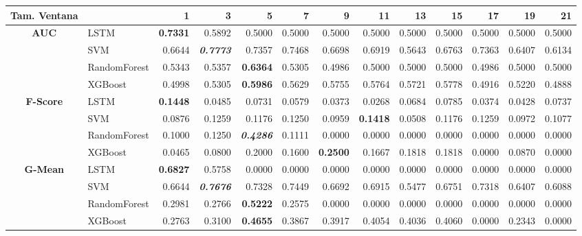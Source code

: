 \begin{table}[H]
	\centering
	\begin{adjustbox}{max width=14cm}
		\begin{tabular}{|c|l|r|r|r|r|r|r|r|r|r|r|r|}
			\hline
			\textbf{Tam. Ventana} &         &      1  &      3  &      5  &      7  &      9  &      11 &      13 &      15 &      17 &      19 &      21 \\
			\hline
			\textbf{AUC} &  LSTM & \textbf{  0.7331 } &  0.5892 &  0.5000 &  0.5000 &  0.5000 &  0.5000 &  0.5000 &  0.5000 &  0.5000 &  0.5000 &  0.5000 \\
			&  SVM &  0.6644 & \textit{ \textbf{  0.7773 } } &  0.7357 &  0.7468 &  0.6698 &  0.6919 &  0.5643 &  0.6763 &  0.7363 &  0.6407 &  0.6134 \\
			&  RandomForest &  0.5343 &  0.5357 & \textbf{  0.6364 } &  0.5305 &  0.4986 &  0.5000 &  0.5000 &  0.5000 &  0.4986 &  0.5000 &  0.5000 \\
			&  XGBoost &  0.4998 &  0.5305 & \textbf{  0.5986 } &  0.5629 &  0.5755 &  0.5764 &  0.5721 &  0.5778 &  0.4916 &  0.5220 &  0.4888 \\
			\hline
			\textbf{F-Score} &  LSTM & \textbf{  0.1448 } &  0.0485 &  0.0731 &  0.0579 &  0.0373 &  0.0268 &  0.0684 &  0.0785 &  0.0374 &  0.0428 &  0.0737 \\
			&  SVM &  0.0876 &  0.1259 &  0.1176 &  0.1250 &  0.0959 & \textbf{  0.1418 } &  0.0508 &  0.1176 &  0.1259 &  0.0972 &  0.1077 \\
			&  RandomForest &  0.1000 &  0.1250 & \textit{ \textbf{  0.4286 } } &  0.1111 &  0.0000 &  0.0000 &  0.0000 &  0.0000 &  0.0000 &  0.0000 &  0.0000 \\
			&  XGBoost &  0.0465 &  0.0800 &  0.2000 &  0.1600 & \textbf{  0.2500 } &  0.1667 &  0.1818 &  0.1818 &  0.0000 &  0.0870 &  0.0000 \\
			\hline
			\textbf{G-Mean} &  LSTM & \textbf{  0.6827 } &  0.5758 &  0.0000 &  0.0000 &  0.0000 &  0.0000 &  0.0000 &  0.0000 &  0.0000 &  0.0000 &  0.0000 \\
			&  SVM &  0.6644 & \textit{ \textbf{  0.7676 } } &  0.7328 &  0.7449 &  0.6692 &  0.6915 &  0.5477 &  0.6751 &  0.7318 &  0.6407 &  0.6088 \\
			&  RandomForest &  0.2981 &  0.2766 & \textbf{  0.5222 } &  0.2575 &  0.0000 &  0.0000 &  0.0000 &  0.0000 &  0.0000 &  0.0000 &  0.0000 \\
			&  XGBoost &  0.2763 &  0.3100 & \textbf{  0.4655 } &  0.3867 &  0.3917 &  0.4054 &  0.4036 &  0.4060 &  0.0000 &  0.2343 &  0.0000 \\

\end{tabular}
\end{adjustbox}
\end{table}
